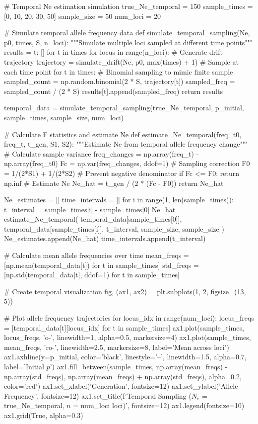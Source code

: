 \documentclass[11pt,a4paper]{article}
\begin{document}
\begin{pycode}
# Temporal Ne estimation simulation
true_Ne_temporal = 150
sample_times = [0, 10, 20, 30, 50]
sample_size = 50
num_loci = 20

# Simulate temporal allele frequency data
def simulate_temporal_sampling(Ne, p0, times, S, n_loci):
    """Simulate multiple loci sampled at different time points"""
    results = {t: [] for t in times}
    for locus in range(n_loci):
        # Generate drift trajectory
        trajectory = simulate_drift(Ne, p0, max(times) + 1)
        # Sample at each time point
        for t in times:
            # Binomial sampling to mimic finite sample
            sampled_count = np.random.binomial(2 * S, trajectory[t])
            sampled_freq = sampled_count / (2 * S)
            results[t].append(sampled_freq)
    return results

temporal_data = simulate_temporal_sampling(true_Ne_temporal, p_initial, sample_times, sample_size, num_loci)

# Calculate F statistics and estimate Ne
def estimate_Ne_temporal(freq_t0, freq_t, t_gen, S1, S2):
    """Estimate Ne from temporal allele frequency change"""
    # Calculate sample variance
    freq_changes = np.array(freq_t) - np.array(freq_t0)
    Fc = np.var(freq_changes, ddof=1)
    # Sampling correction
    F0 = 1/(2*S1) + 1/(2*S2)
    # Prevent negative denominator
    if Fc <= F0:
        return np.inf
    # Estimate Ne
    Ne_hat = t_gen / (2 * (Fc - F0))
    return Ne_hat

Ne_estimates = []
time_intervals = []
for i in range(1, len(sample_times)):
    t_interval = sample_times[i] - sample_times[0]
    Ne_hat = estimate_Ne_temporal(
        temporal_data[sample_times[0]],
        temporal_data[sample_times[i]],
        t_interval,
        sample_size,
        sample_size
    )
    Ne_estimates.append(Ne_hat)
    time_intervals.append(t_interval)

# Calculate mean allele frequencies over time
mean_freqs = [np.mean(temporal_data[t]) for t in sample_times]
std_freqs = [np.std(temporal_data[t], ddof=1) for t in sample_times]

# Create temporal visualization
fig, (ax1, ax2) = plt.subplots(1, 2, figsize=(13, 5))

# Plot allele frequency trajectories
for locus_idx in range(num_loci):
    locus_freqs = [temporal_data[t][locus_idx] for t in sample_times]
    ax1.plot(sample_times, locus_freqs, 'o-', linewidth=1, alpha=0.5, markersize=4)
ax1.plot(sample_times, mean_freqs, 'ro-', linewidth=2.5, markersize=8, label='Mean across loci')
ax1.axhline(y=p_initial, color='black', linestyle='--', linewidth=1.5, alpha=0.7, label='Initial $p$')
ax1.fill_between(sample_times,
                  np.array(mean_freqs) - np.array(std_freqs),
                  np.array(mean_freqs) + np.array(std_freqs),
                  alpha=0.2, color='red')
ax1.set_xlabel('Generation', fontsize=12)
ax1.set_ylabel('Allele Frequency', fontsize=12)
ax1.set_title(f'Temporal Sampling ($N_e$ = {true_Ne_temporal}, $n$ = {num_loci} loci)', fontsize=12)
ax1.legend(fontsize=10)
ax1.grid(True, alpha=0.3)


\end{pycode}
\end{document}
